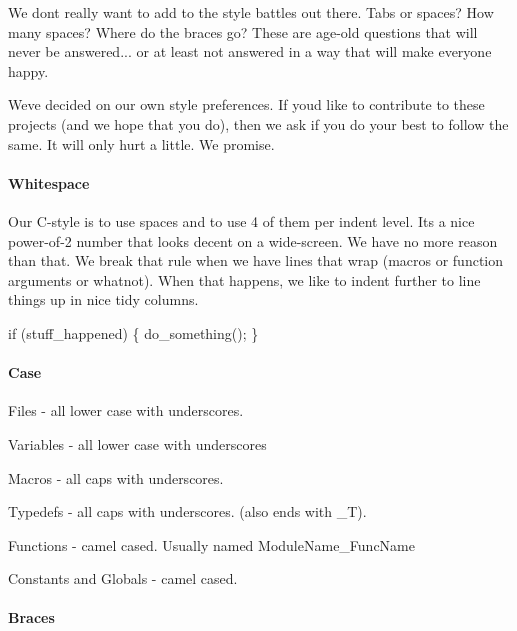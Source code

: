 We don\textquotesingle{}t really want to add to the style battles out there. Tabs or spaces? How many spaces? Where do the braces go? These are age-\/old questions that will never be answered... or at least not answered in a way that will make everyone happy.

We\textquotesingle{}ve decided on our own style preferences. If you\textquotesingle{}d like to contribute to these projects (and we hope that you do), then we ask if you do your best to follow the same. It will only hurt a little. We promise.

\paragraph*{Whitespace}

Our C-\/style is to use spaces and to use 4 of them per indent level. It\textquotesingle{}s a nice power-\/of-\/2 number that looks decent on a wide-\/screen. We have no more reason than that. We break that rule when we have lines that wrap (macros or function arguments or whatnot). When that happens, we like to indent further to line things up in nice tidy columns.


\begin{DoxyCode}
\textcolor{keywordflow}{if} (stuff\_happened)
\{
    do\_something();
\}
\end{DoxyCode}


\paragraph*{Case}


\begin{DoxyItemize}
\item Files -\/ all lower case with underscores.
\item Variables -\/ all lower case with underscores
\item Macros -\/ all caps with underscores.
\item Typedefs -\/ all caps with underscores. (also ends with \+\_\+T).
\item Functions -\/ camel cased. Usually named Module\+Name\+\_\+\+Func\+Name
\item Constants and Globals -\/ camel cased.
\end{DoxyItemize}

\paragraph*{Braces}

